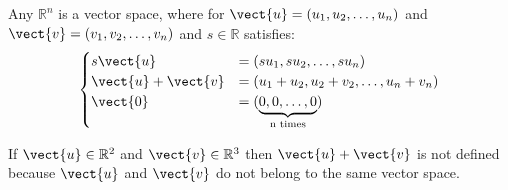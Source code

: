 \begin{example}
Any $\mathbb{R}^n$ is a vector space, where for $\vect{u}=\left(u_1,u_2,\ldots ,u_n\right)$ and $\vect{v}=\left(v_1,v_2,\ldots ,v_n\right)$ and $s \in \mathbb{R}$ satisfies:
    \begin{equation*}
    	\begin{cases}
		s\vect{u} &= \left(su_1,su_2,\ldots ,su_n\right) \\
		\vect{u}+\vect{v} &= \left(u_1 + u_2 , u_2 + v_2 ,\ldots ,u_n + v_n \right) \\
		\vect{0} &= (\underbrace{0,0,\ldots ,0}_\text{n times})
	\end{cases}
    \end{equation*}
\end{example}

\note If $\vect{u} \in \mathbb{R}^2$ and $\vect{v} \in \mathbb{R}^3$ then $\vect{u} + \vect{v}$ is not defined because $\vect{u}$ and $\vect{v}$ do not belong to the same vector space.

